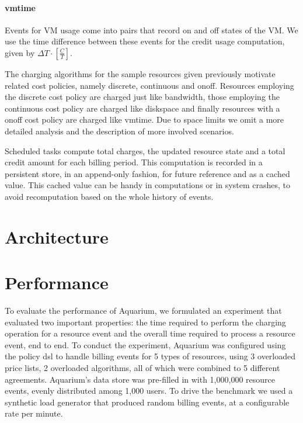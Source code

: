 \documentclass[letterpaper,twocolumn,10pt]{article}
\begin{document}
\paragraph{\textsf{vmtime}}
Events for VM usage come into pairs that record \textsf{on} and
\textsf{off} states of the VM. We use the time difference between
these events for the credit usage computation, given by $\Delta T
\cdot [ \frac{C}{T} ]$.

The charging algorithms for the sample resources given previously
motivate related cost policies, namely \textsf{discrete},
\textsf{continuous} and \textsf{onoff}. Resources employing the
\textsf{discrete} cost policy are charged just like
\textsf{bandwidth}, those employing the \textsf{continuous} cost
policy are charged like \textsf{diskspace} and finally resources with
a \textsf{onoff} cost policy are charged like \textsf{vmtime}. Due to
space limits we omit a more detailed analysis and the description of
more involved scenarios.

Scheduled tasks compute total charges, the updated resource state and
a total credit amount for each billing period. This computation is
recorded in a persistent store, in an append-only fashion, for future
reference and as a cached value. This cached value can be handy in
computations or in system crashes, to avoid recomputation based on the
whole history of events.

\section{Architecture}


\section{Performance}

To evaluate the performance of Aquarium, we formulated an experiment
that evaluated two important properties: the time required to perform
the charging operation for a resource event and the overall time
required to process a resource event, end to end. To conduct the
experiment, Aquarium was configured using the policy {\sc dsl} to
handle billing events for 5 types of resources, using 3 overloaded
price lists, 2 overloaded algorithms, all of which were combined to 5
different agreements. Aquarium's data store was pre-filled in with
1,000,000 resource events, evenly distributed among 1,000 users. To
drive the benchmark we used a synthetic load generator that produced
random billing events, at a configurable rate per minute.
\end{document}
